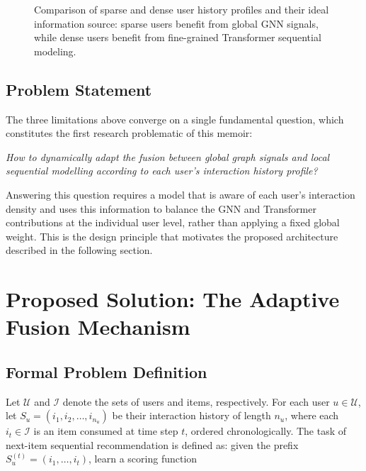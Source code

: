 \documentclass[12pt,a4paper]{report}
\begin{document}
\begin{figure}[h]
    \centering
    \caption{Comparison of sparse and dense user history profiles and their
    ideal information source: sparse users benefit from global GNN signals,
    while dense users benefit from fine-grained Transformer sequential modeling.}
    \label{fig:sparse_dense}
\end{figure}

\subsection*{Problem Statement}

The three limitations above converge on a single fundamental question, which
constitutes the first research problematic of this memoir:

\begin{mdframed}[
    linecolor=black, linewidth=0.8pt,
    innertopmargin=10pt, innerbottommargin=10pt,
    innerleftmargin=14pt, innerrightmargin=14pt,
    roundcorner=3pt
]
\textit{How to dynamically adapt the fusion between global graph signals and
local sequential modelling according to each user's interaction history
profile?}
\end{mdframed}

Answering this question requires a model that is aware of each user's
interaction density and uses this information to balance the GNN and
Transformer contributions at the individual user level, rather than applying
a fixed global weight. This is the design principle that motivates the
proposed architecture described in the following section.


\section{Proposed Solution: The Adaptive Fusion Mechanism}
\label{sec:solution}

\subsection{Formal Problem Definition}

Let \(\mathcal{U}\) and \(\mathcal{I}\) denote the sets of users and items,
respectively. For each user \(u \in \mathcal{U}\), let
\(S_u = (i_1, i_2, \ldots, i_{n_u})\) be their interaction history of length
\(n_u\), where each \(i_t \in \mathcal{I}\) is an item consumed at time step
\(t\), ordered chronologically. The task of next-item sequential recommendation
is defined as: given the prefix \(S_u^{(t)} = (i_1, \ldots, i_t)\), learn a
scoring function
\end{document}
